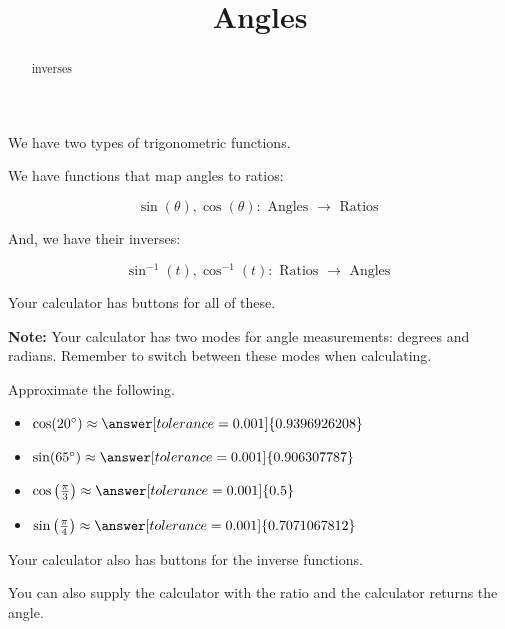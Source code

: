 \documentclass{ximera}
\title{Angles}
\begin{document}
\begin{abstract}
inverses
\end{abstract}
\maketitle




We have two types of trigonometric functions.


We have functions that map angles to ratios:


\[
\sin(\theta), \cos(\theta) :  \text{ Angles } \to \text{ Ratios }
\]


And, we have their inverses:



\[
\sin^{-1}(t), \cos^{-1}(t) :  \text{ Ratios } \to \text{ Angles }
\]








Your calculator has buttons for all of these.


\textbf{Note:}  Your calculator has two modes for angle measurements: degrees and radians.  Remember to switch between these modes when calculating.



\begin{question} 


Approximate the following.

\begin{itemize}
\item $\cos(20^{\circ}) \approx \answer[tolerance=0.001]{0.9396926208}$
\item $\sin(65^{\circ}) \approx \answer[tolerance=0.001]{0.906307787}$
\item $\cos\left( \frac{\pi}{3} \right) \approx \answer[tolerance=0.001]{0.5}$
\item $\sin\left( \frac{\pi}{4} \right) \approx \answer[tolerance=0.001]{0.7071067812}$
\end{itemize}

\end{question}





Your calculator also has buttons for the inverse functions. 




You can also supply the calculator with the ratio and the calculator returns the angle.
\end{document}
